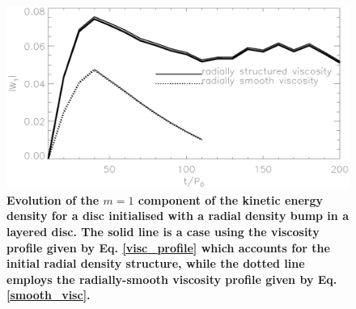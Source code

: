 {%

  


 \begin{figure}
  \centering
  \includegraphics[width=\linewidth]{figures/pdisk_kerz_cases_appendix.ps}
  \caption{{\bf Evolution of the $m=1$ component of the kinetic energy density for 
   a disc initialised with a radial density bump in a layered disc. The solid line is a case using 
   the viscosity profile given by Eq. \ref{visc_profile} which accounts for the initial radial density 
   structure, while the dotted line employs the radially-smooth viscosity profile given by Eq. \ref{smooth_visc}.  }
    \label{appen}}
  \end{figure}  
}
